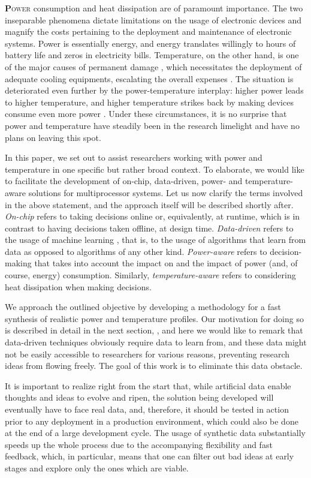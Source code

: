 \lettrine[findent=0.4em, nindent=0em]{\textbf{P}}{ower} consumption and heat
dissipation are of paramount importance. The two inseparable phenomena dictate
limitations on the usage of electronic devices and magnify the costs pertaining
to the deployment and maintenance of electronic systems. Power is essentially
energy, and energy translates willingly to hours of battery life and zeros in
electricity bills. Temperature, on the other hand, is one of the major causes of
permanent damage \cite{jedec}, which necessitates the deployment of adequate
cooling equipments, escalating the overall expenses \cite{chaudhry2015}. The
situation is deteriorated even further by the power-temperature interplay:
higher power leads to higher temperature, and higher temperature strikes back by
making devices consume even more power \cite{liu2007}. Under these
circumstances, it is no surprise that power and temperature have steadily been
in the research limelight and have no plans on leaving this spot.

In this paper, we set out to assist researchers working with power and
temperature in one specific but rather broad context. To elaborate, we would
like to facilitate the development of on-chip, data-driven, power- and
temperature-aware solutions for multiprocessor systems. Let us now clarify the
terms involved in the above statement, and the approach itself will be described
shortly after. \emph{On-chip} refers to taking decisions online or,
equivalently, at runtime, which is in contrast to having decisions taken
offline, at design time. \emph{Data-driven} refers to the usage of machine
learning \cite{bishop2006}, that is, to the usage of algorithms that learn from
data as opposed to algorithms of any other kind. \emph{Power-aware} refers to
decision-making that takes into account the impact on and the impact of power
(and, of course, energy) consumption. Similarly, \emph{temperature-aware} refers
to considering heat dissipation when making decisions.

We approach the outlined objective by developing a methodology for a fast
synthesis of realistic power and temperature profiles. Our motivation for doing
so is described in detail in the next section, , and here we
would like to remark that data-driven techniques obviously require data to learn
from, and these data might not be easily accessible to researchers for various
reasons, preventing research ideas from flowing freely. The goal of this work is
to eliminate this data obstacle.

It is important to realize right from the start that, while artificial data
enable thoughts and ideas to evolve and ripen, the solution being developed will
eventually have to face real data, and, therefore, it should be tested in action
prior to any deployment in a production environment, which could also be done at
the end of a large development cycle. The usage of synthetic data substantially
speeds up the whole process due to the accompanying flexibility and fast
feedback, which, in particular, means that one can filter out bad ideas at early
stages and explore only the ones which are viable.

